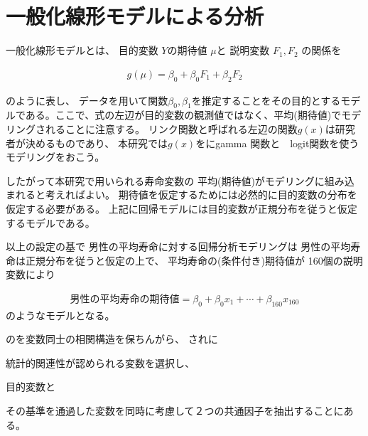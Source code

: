\documentclass[a4j,11pt,mc]{jreport}
\begin{document}

%
%
%
%
%
%
%








\chapter{一般化線形モデルによる分析}\label{glm}



一般化線形モデルとは、
目的変数
$Y$の期待値
$\mu$と
説明変数
$F_1, F_2$
の関係を

\begin{eqnarray}
g(\mu)=\beta_0 +\beta_0F_1 + \beta_2 F_2
\end{eqnarray}


のように表し、
データを用いて関数$\beta_0 ,\beta_1 $を推定することをその目的とするモデルである。ここで、式の左辺が目的変数の観測値ではなく、平均(期待値)でモデリングされることに注意する。
リンク関数と呼ばれる左辺の関数$g(x)$は研究者が決めるものであり、
本研究では$g(x)$をにgamma 関数と　logit関数を使うモデリングをおこう。

したがって本研究で用いられる寿命変数の
平均(期待値)がモデリングに組み込まれると考えればよい。
期待値を仮定するためには必然的に目的変数の分布を仮定する必要がある。
上記に回帰モデルには目的変数が正規分布を従うと仮定するモデルである。

以上の設定の基で
男性の平均寿命に対する回帰分析モデリングは
男性の平均寿命は正規分布を従うと仮定の上で、
平均寿命の(条件付き)期待値が
160個の説明変数により

\begin{eqnarray}
\mbox{男性の平均寿命の期待値}=
\beta_0 +\beta_0x_1 +\cdots + \beta_{160} x_{160}
\end{eqnarray}
のようなモデルとなる。



のを変数同士の相関構造を保ちんがら、
されに

統計的関連性が認められる変数を選択し、


目的変数と





その基準を通過した変数を同時に考慮して２つの共通因子を抽出することにある。
\end{document}

